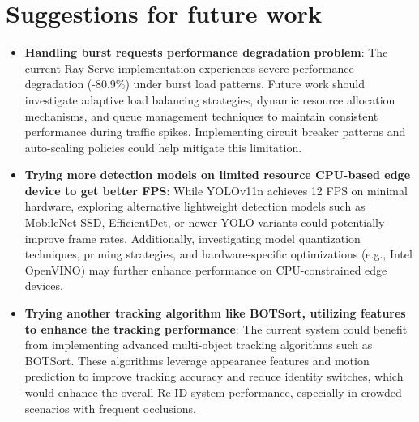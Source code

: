 \documentclass[../main.tex]{subfiles}
\begin{document}
\section{Suggestions for future work}

\begin{itemize}
    \item \textbf{Handling burst requests performance degradation problem}: The current Ray Serve implementation experiences severe performance degradation (-80.9\%) under burst load patterns. Future work should investigate adaptive load balancing strategies, dynamic resource allocation mechanisms, and queue management techniques to maintain consistent performance during traffic spikes. Implementing circuit breaker patterns and auto-scaling policies could help mitigate this limitation.
    
    \item \textbf{Trying more detection models on limited resource CPU-based edge device to get better FPS}: While YOLOv11n achieves 12 FPS on minimal hardware, exploring alternative lightweight detection models such as MobileNet-SSD, EfficientDet, or newer YOLO variants could potentially improve frame rates. Additionally, investigating model quantization techniques, pruning strategies, and hardware-specific optimizations (e.g., Intel OpenVINO) may further enhance performance on CPU-constrained edge devices.
    
    \item \textbf{Trying another tracking algorithm like BOTSort, utilizing features to enhance the tracking performance}: The current system could benefit from implementing advanced multi-object tracking algorithms such as BOTSort\cite{aharon2022botsortrobustassociationsmultipedestrian}. These algorithms leverage appearance features and motion prediction to improve tracking accuracy and reduce identity switches, which would enhance the overall Re-ID system performance, especially in crowded scenarios with frequent occlusions.
\end{itemize}
\end{document}
